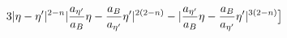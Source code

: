 \begin{equation}
3|\eta - \eta'|^{2-n}|\frac{a_{\eta'}}{a_{B}}\eta - \frac{a_{B}}{a_{\eta'}}\eta'|^{2(2-n)} - |\frac{a_{\eta'}}{a_{B}}\eta - 
\frac{a_{B}}{a_{\eta'}}\eta'|^{3(2-n)}\big{]} 
\end{equation}

